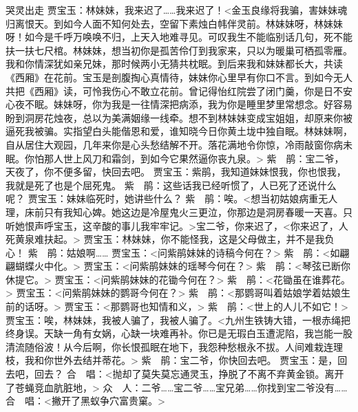 \documentclass{article}
\begin{document}
哭灵出走
贾宝玉：林妹妹，我来迟了……我来迟了！<金玉良缘将我骗，害妹妹魂归离恨天。到如今人面不知何处去，空留下素烛白帏伴灵前。林妹妹呀，林妹妹呀！如今是千呼万唤唤不归，上天入地难寻见。可叹我生不能临别话几句，死不能扶一扶七尺棺。林妹妹，想当初你是孤苦伶仃到我家来，只以为暖巢可栖孤零雁。我和你情深犹如亲兄妹，那时候两小无猜共枕眠。到后来我和妹妹都长大，共读《西厢》在花前。宝玉是剖腹掏心真情待，妹妹你心里早有你口不言。到如今无人共把《西厢》读，可怜我伤心不敢立花前。曾记得怡红院尝了闭门羹，你是日不安心夜不眠。妹妹呀，你为我是一往情深把病添，我为你是睡里梦里常想念。好容易盼到洞房花烛夜，总以为美满姻缘一线牵。想不到林妹妹变成宝姐姐，却原来你被逼死我被骗。实指望白头能偕恩和爱，谁知晓今日你黄土垅中独自眠。林妹妹啊，自从居住大观园，几年来你是心头愁结解不开。落花满地令你惊，冷雨敲窗你病未眠。你怕那人世上风刀和霜剑，到如今它果然逼你丧九泉。>
紫　鹃：宝二爷，天夜了，你不便多留，快回去吧。
贾宝玉：紫鹃，我知道妹妹恨我，你也恨我，我就是死了也是个屈死鬼。
紫　鹃：这些话我已经听惯了，人已死了还说什么呢？
贾宝玉：妹妹临死时，她讲些什么？
紫　鹃：唉。<想当初姑娘病重无人理，床前只有我知心婢。她这边是冷屋鬼火三更泣，你那边是洞房春暖一天喜。只听她恨声呼宝玉，这辛酸的事儿我牢牢记。>宝二爷，你来迟了，<你来迟了，人死黄泉难扶起。>
贾宝玉：林妹妹，你不能怪我，这是父母做主，并不是我负心！
紫　鹃：姑娘啊……
贾宝玉：<问紫鹃妹妹的诗稿今何在？>
紫　鹃：<如翩翩蝴蝶火中化。>
贾宝玉：<问紫鹃妹妹的瑶琴今何在？>
紫　鹃：<琴弦已断你休提它。>
贾宝玉：<问紫鹃妹妹的花锄今何在？>
紫　鹃：<花锄虽在谁葬花。>
贾宝玉：<问紫鹃妹妹的鹦哥今何在？>
紫　鹃：<那鹦哥叫着姑娘学着姑娘生前的话呀。>
贾宝玉：<那鹦哥也知情和义，>
紫　鹃：<世上的人儿不如它！>
贾宝玉：唉，林妹妹，我被人骗了，我被人骗了。<九州生铁铸大错，一根赤绳把终身误。天缺一角有女娲，心缺一块难再补。你已是无瑕白玉遭泥陷，我岂能一股清流随俗波！从今后啊，你长恨孤眠在地下，我怨种愁根永不拔。人间难栽连理枝，我和你世外去结并蒂花。>
紫　鹃：宝二爷，你快回去吧。
贾宝玉：是，回去吧，回去？
合　唱：<抛却了莫失莫忘通灵玉，挣脱了不离不弃黄金锁。离开了苍蝇竞血肮脏地，>
众　人：二爷……宝二爷……宝兄弟……你找到宝二爷没有……
合　唱：<撇开了黑蚁争穴富贵窠。>
\end{document}
